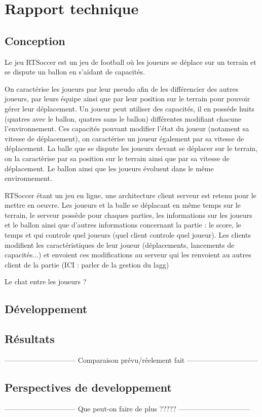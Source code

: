 \chapter{Rapport technique}


\section{Conception}

Le jeu RTSoccer est un jeu de football où les joueurs se déplace sur un terrain et se dispute un ballon en s'aidant de capacités.

On caractérise les joueurs par leur pseudo afin de les différencier des autres joueurs, par leurs équipe ainsi que par leur position sur le terrain pour pouvoir gérer leur déplacement. Un joueur peut utiliser des capacités, il en posséde huits  (quatres avec le ballon, quatres sans le ballon) différentes modifiant chacune l'environnement. Ces capacités pouvant modifier l'état du joueur (notament sa vitesse de déplacement), on caractérise un joueur également par sa vitesse de déplacement.
La balle que se dispute les joueurs devant se déplacer sur le terrain, on la caractèrise par sa position sur le terrain ainsi que par sa vitesse de déplacement.
Le ballon ainsi que les joueurs évoluent dans le même environnement.

RTSoccer étant un jeu en ligne, une architecture client serveur est retenu pour le mettre en oeuvre.
Les joueurs et la balle se déplacant en même temps sur le terrain, le serveur possède pour chaques parties, les informations sur les joueurs et le ballon ainsi que d'autres informations concernant la partie : le score, le temps et qui controle quel joueurs (quel client controle quel joueur).
Les clients modifient les caractéristiques de leur joueur (déplacements, lancements de capacités...) et envoient ces modifications au serveur qui les renvoient au autres client de la partie (ICI : parler de la gestion du lagg)

Le chat entre les joueurs ?


\section{Développement}



\section{Résultats}

------------------------------
Comparaison prévu/réelement fait
------------------------------


\section{Perspectives de developpement}

------------------------------
Que peut-on faire de plus ?????
------------------------------